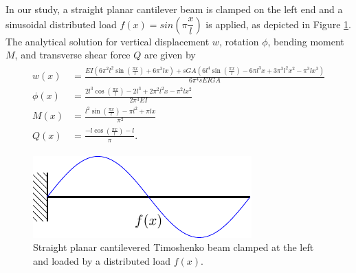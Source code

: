 \documentclass{article}
\begin{document}
In our study, a straight planar cantilever beam is clamped on the left end and a sinusoidal distributed load $f(x)=sin(\pi\dfrac{x}{l})$ is applied, as depicted in Figure \ref{fig:load_beam}. The analytical solution for vertical displacement $w$, rotation $\phi$, bending moment $M$, and transverse shear force $Q$ are given by
\begin{align}
\begin{split}
w(x)&=\frac{EI\left(6 \pi ^2 l^2 \sin \left(\frac{\pi  x}{l}\right)+6 \pi ^3 l x\right)+sGA\left(6 l^4 \sin \left(\frac{\pi  x}{l}\right)-6 \pi l^3 x+3 \pi ^3 l^2 x^2-\pi ^3 l x^3\right)}{6 \pi ^4 sEIGA}\\
\phi(x)&=\frac{2 l^3 \cos \left(\frac{\pi  x}{l}\right)-2 l^3+2 \pi ^2 l^2 x-\pi ^2 l x^2}{2 \pi ^3 EI}\\
M(x)&=\frac{l^2 \sin \left(\frac{\pi  x}{l}\right)-\pi  l^2+\pi  l x}{\pi ^2}\\
Q(x)&=\frac{-l\cos \left(\frac{\pi  x}{l}\right)-l}{\pi}.
\end{split}
\label{eq:timoshenko_analytical}
\end{align}
\begin{figure}[h]
	\centering
	\includegraphics[width=0.4\linewidth]{beam_load}
	\caption{Straight planar cantilevered Timoshenko beam clamped at the left and loaded by a distributed load $f(x)$.}
	\label{fig:load_beam}
\end{figure}
\end{document}
